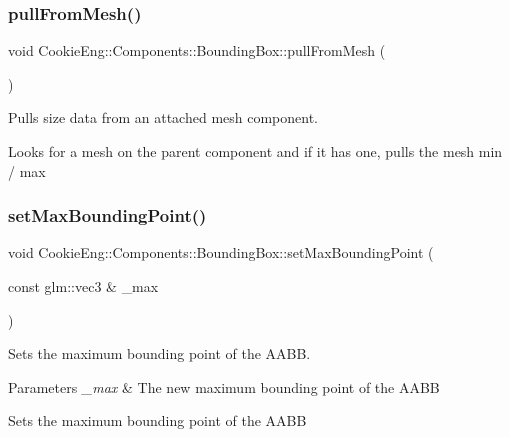 \subsubsection{\texorpdfstring{pull\+From\+Mesh()}{pullFromMesh()}}
{\footnotesize\ttfamily void Cookie\+Eng\+::\+Components\+::\+Bounding\+Box\+::pull\+From\+Mesh (\begin{DoxyParamCaption}{ }\end{DoxyParamCaption})}



Pulls size data from an attached mesh component. 

Looks for a mesh on the parent component and if it has one, pulls the mesh min / max \mbox{\label{class_cookie_eng_1_1_components_1_1_bounding_box_a5ad6bf701d391f3d5357a6e103e942e2}} 
\subsubsection{\texorpdfstring{set\+Max\+Bounding\+Point()}{setMaxBoundingPoint()}}
{\footnotesize\ttfamily void Cookie\+Eng\+::\+Components\+::\+Bounding\+Box\+::set\+Max\+Bounding\+Point (\begin{DoxyParamCaption}\item[{const glm\+::vec3 \&}]{\+\_\+max }\end{DoxyParamCaption})\hspace{0.3cm}{\ttfamily [inline]}}



Sets the maximum bounding point of the A\+A\+BB. 


\begin{DoxyParams}{Parameters}
{\em \+\_\+max} & The new maximum bounding point of the A\+A\+BB\\
\hline
\end{DoxyParams}
Sets the maximum bounding point of the A\+A\+BB \mbox{\label{class_cookie_eng_1_1_components_1_1_bounding_box_a268f31408a9f91765de7f9b052c97c85}} 
